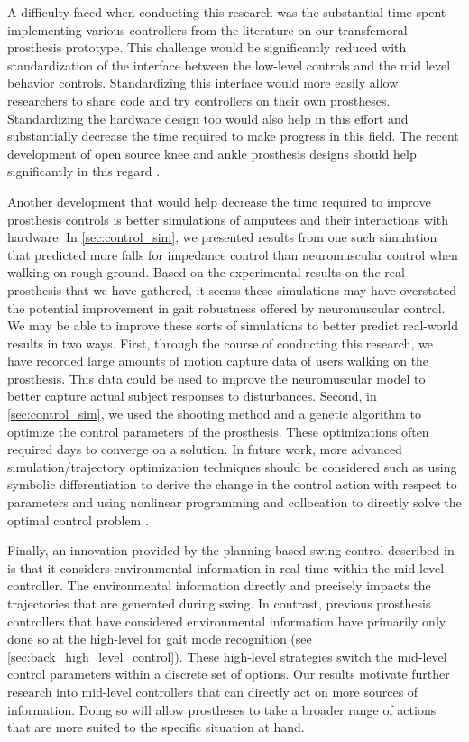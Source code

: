 A difficulty faced when conducting this research was the substantial time spent
implementing various controllers from the literature on our transfemoral
prosthesis prototype.  This challenge would be significantly reduced with
standardization of the interface between the low-level controls and the mid
level behavior controls. Standardizing this interface would more easily allow
researchers to share code and try controllers on their own prostheses.
Standardizing the hardware design too would also help in this effort and
substantially decrease the time required to make progress in this field. The
recent development of open source knee and ankle prosthesis designs should help
significantly in this regard \citep{azocar2018design}.

Another development that would help decrease the time required to improve
prosthesis controls is better simulations of amputees and their interactions
with hardware. In \cref{sec:control_sim}, we presented results from one such
simulation that predicted more falls for impedance control than neuromuscular
control when walking on rough ground. Based on the experimental results on the
real prosthesis that we have gathered, it seems these simulations may have
overstated the potential improvement in gait robustness offered by neuromuscular
control. We may be able to improve these sorts of simulations to better predict
real-world results in two ways. First, through the course of conducting this
research, we have recorded large amounts of motion capture data of users walking
on the prosthesis. This data could be used to improve the neuromuscular model to
better capture actual subject responses to disturbances. Second, in
\cref{sec:control_sim}, we used the shooting method and a genetic algorithm
\citep{hansen2006cma} to optimize the control parameters of the prosthesis.
These optimizations often required days to converge on a solution. In future
work, more advanced simulation/trajectory optimization techniques should be
considered such as using symbolic differentiation to derive the change in the
control action with respect to parameters and using nonlinear programming and
collocation to directly solve the optimal control problem
\citep{hargraves1987direct}. 

Finally, an innovation provided by the planning-based swing control described in
is that it considers environmental information in real-time within the mid-level
controller. The environmental information directly and precisely impacts the
trajectories that are generated during swing. In contrast, previous prosthesis
controllers that have considered environmental information have primarily only
done so at the high-level for gait mode recognition (see
\cref{sec:back_high_level_control}). These high-level strategies switch the
mid-level control parameters within a discrete set of options. Our results
motivate further research into mid-level controllers that can directly act on
more sources of information. Doing so will allow prostheses to take a broader
range of actions that are more suited to the specific situation at hand. 
